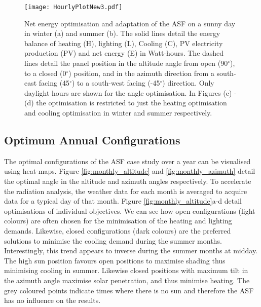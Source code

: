 \begin{figure}
\begin{center}
\texttt{[image: HourlyPlotNew3.pdf]}
\caption{Net energy optimisation and adaptation of the ASF on a sunny day in winter (a) and summer (b). The solid lines detail the energy balance of heating (H), lighting (L), Cooling (C), PV electricity production (PV) and net energy (E) in Watt-hours. The dashed lines detail the panel position in the altitude angle from open (90$^{\circ}$), to a closed (0$^{\circ}$) position, and in the azimuth direction from a south-east facing (45$^{\circ}$) to a south-west facing (-45$^{\circ}$) direction. Only daylight hours are shown for the angle optimisation. In Figures (c) - (d) the optimisation is restricted to just the heating optimisation and cooling optimisation in winter and summer respectively.}
\label{fig:transient}
\end{center}
\end{figure}

\subsection{Optimum Annual Configurations}
\label{ch:optimal}

The optimal configurations of the ASF case study over a year can be visualised using heat-maps. Figure \ref{fig:monthly_altitude} and \ref{fig:monthly_azimuth} detail the optimal angle in the altitude and azimuth angles respectively. To accelerate the radiation analysis, the weather data for each month is averaged to acquire data for a typical day of that month. Figure \ref{fig:monthly_altitude}a-d detail optimisations of individual objectives. We can see how open configurations (light colours) are often chosen for the minimisation of the heating and lighting demands. Likewise, closed configurations (dark colours) are the preferred solutions to minimise the cooling demand during the summer months. Interestingly, this trend appears to inverse during the summer months at midday. The high sun position favours open positions to maximise shading thus minimising cooling in summer. Likewise closed positions with maximum tilt in the azimuth angle maximise solar penetration, and thus minimise heating. The grey coloured points indicate times where there is no sun and therefore the ASF has no influence on the results. 

